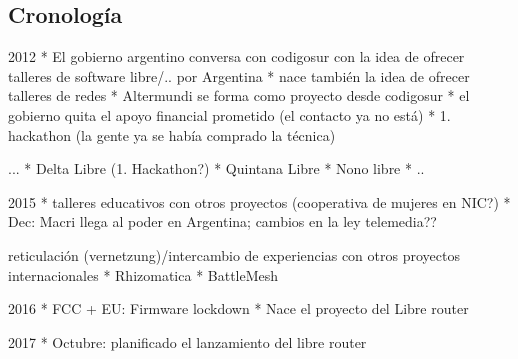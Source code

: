 \begin{comment}
ANT: podemos hacer aquí zooms in y out!

                          * da talleres
                          * apoyo técnico
                          * Bildungsauftrag

            Altermundi <-----------------------> redes
         /   ^                                     ^
individuos   |                                     |
             |                                     |
             |                                     |
             |                                     |
             v                                     v
            estado<-------------------------> infraestructura

Altermundi:
* individuos, gente que se comunica entre si, con todos los problemas y desafíos que surgen de esto
* tiene una forma organizativa legal: asociación? fundación? (siehe IV) para poder entrar en alianzas, cooperaciones (con el estado y otras organizaciones formales, p.e. la Universidad de Córdoba)
* función auxiliar (las redes son autónomas)

Estado:
* está responsable para regulaciones que ayudan o impiden el trabajo de tales proyectos (ley telemediatica)
* la última milla
* solucionar el problema de conexión de manera completa/de gran escala (siehe papel del estado)
* apoyo financial (eher nicht, vgl Entstehungsgeschichte)

Infraestructura:
* ¿donde está?
* quien la mantiene/gestiona/instala
* quien tiene acceso?

Redes
* autónomas
* tensiones: problemas con la comunicación dentro de la comunidad
* falta de conocimientos técnicos

\end{comment}

\subsection{Cronología}

2012
* El gobierno argentino conversa con codigosur con la idea de ofrecer talleres de software libre/.. por Argentina
* nace también la idea de ofrecer talleres de redes
* Altermundi se forma como proyecto desde codigosur
* el gobierno quita el apoyo financial prometido (el contacto ya no está)
* 1. hackathon (la gente ya se había comprado la técnica)

...
* Delta Libre (1. Hackathon?)
* Quintana Libre
* Nono libre
* ..

2015
* talleres educativos con otros proyectos (cooperativa de mujeres en NIC?)
* Dec: Macri llega al poder en Argentina; cambios en la ley telemedia??


reticulación (vernetzung)/intercambio de experiencias con otros proyectos internacionales
* Rhizomatica
* BattleMesh



2016
* FCC + EU: Firmware lockdown
* Nace el proyecto del Libre router

2017
* Octubre: planificado el lanzamiento del libre router

